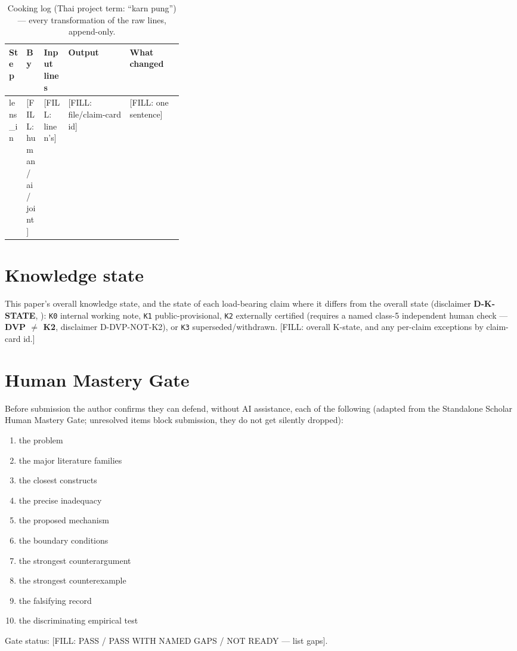 \documentclass[11pt]{article}
\begin{document}
\begin{table}[H]
\centering
\scriptsize
\begin{tabularx}{\linewidth}{@{}p{0.1\linewidth} p{0.1\linewidth} p{0.14\linewidth} X X@{}}
\toprule
\textbf{Step} & \textbf{By} & \textbf{Input lines} & \textbf{Output} & \textbf{What changed} \\
\midrule
lens\_in & [FILL: human / ai / joint] & [FILL: line n's] & [FILL: file/claim-card id] & [FILL: one sentence] \\
\bottomrule
\end{tabularx}
\caption{Cooking log (Thai project term: ``karn pung'') --- every transformation of the raw lines, append-only.}
\label{tab:cooking-log}
\end{table}

\section{Knowledge state}
\label{sec:kstate}
This paper's overall knowledge state, and the state of each load-bearing
claim where it differs from the overall state (disclaimer
\textbf{D-K-STATE}, ):
\texttt{K0} internal working note, \texttt{K1} public-provisional,
\texttt{K2} externally certified (requires a named class-5 independent human
check --- \textbf{DVP $\neq$ K2}, disclaimer D-DVP-NOT-K2), or \texttt{K3}
superseded/withdrawn. [FILL: overall K-state, and any per-claim exceptions
by claim-card id.]

\section{Human Mastery Gate}
\label{sec:mastery-gate}
Before submission the author confirms they can defend, without AI assistance,
each of the following (adapted from the Standalone Scholar Human Mastery
Gate; unresolved items block submission, they do not get silently dropped):
\begin{enumerate}[itemsep=0.1em]
  \item the problem \item the major literature families \item the closest
  constructs \item the precise inadequacy \item the proposed mechanism
  \item the boundary conditions \item the strongest counterargument
  \item the strongest counterexample \item the falsifying record
  \item the discriminating empirical test
\end{enumerate}
Gate status: [FILL: PASS / PASS WITH NAMED GAPS / NOT READY --- list gaps].
\end{document}
